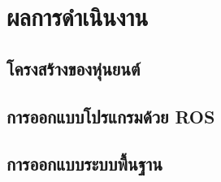 \chapter{ผลการดำเนินงาน}
\section{โครงสร้างของหุ่นยนต์}


\clearpage
\section{การออกแบบโปรแกรมด้วย ROS}


\clearpage
\section{การออกแบบระบบพื้นฐาน}
